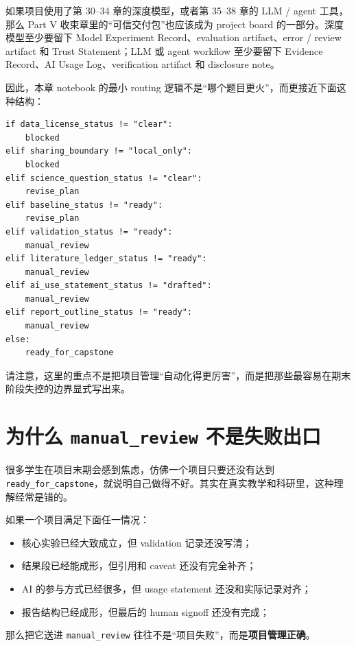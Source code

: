 如果项目使用了第 30--34 章的深度模型，或者第 35--38 章的 LLM / agent 工具，那么 Part V 收束章里的“可信交付包”也应该成为 project board 的一部分。深度模型至少要留下 Model Experiment Record、evaluation artifact、error / review artifact 和 Trust Statement；LLM 或 agent workflow 至少要留下 Evidence Record、AI Usage Log、verification artifact 和 disclosure note。

因此，本章 notebook 的最小 routing 逻辑不是“哪个题目更火”，而更接近下面这种结构：

\begin{examplebox}
\begin{lstlisting}[style=pythonstyle]
if data_license_status != "clear":
    blocked
elif sharing_boundary != "local_only":
    blocked
elif science_question_status != "clear":
    revise_plan
elif baseline_status != "ready":
    revise_plan
elif validation_status != "ready":
    manual_review
elif literature_ledger_status != "ready":
    manual_review
elif ai_use_statement_status != "drafted":
    manual_review
elif report_outline_status != "ready":
    manual_review
else:
    ready_for_capstone
\end{lstlisting}
\end{examplebox}

请注意，这里的重点不是把项目管理“自动化得更厉害”，而是把那些最容易在期末阶段失控的边界显式写出来。

\section{为什么 \texttt{manual\_review} 不是失败出口}

很多学生在项目末期会感到焦虑，仿佛一个项目只要还没有达到 \texttt{ready\_for\_capstone}，就说明自己做得不好。其实在真实教学和科研里，这种理解经常是错的。

如果一个项目满足下面任一情况：

\begin{itemize}
    \item 核心实验已经大致成立，但 validation 记录还没写清；
    \item 结果段已经能成形，但引用和 caveat 还没有完全补齐；
    \item AI 的参与方式已经很多，但 usage statement 还没和实际记录对齐；
    \item 报告结构已经成形，但最后的 human signoff 还没有完成；
\end{itemize}

那么把它送进 \texttt{manual\_review} 往往不是“项目失败”，而是\textbf{项目管理正确}。

